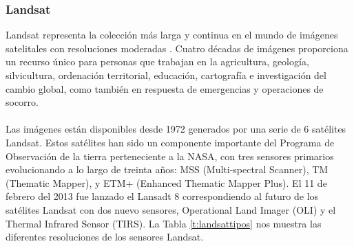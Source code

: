 \subsubsection{Landsat}\label{sec:landsat}
Landsat representa la colecci\'on m\'as larga y continua en el mundo de im\'agenes satelitales con resoluciones moderadas \cite{landsatNasa}. Cuatro d\'ecadas de im\'agenes proporciona un recurso \'unico para personas que trabajan en la agricultura, geolog\'ia, silvicultura, ordenaci\'on territorial, educaci\'on, cartograf\'ia e investigaci\'on del cambio global, como tambi\'en en respuesta de emergencias y operaciones de socorro.\\~\\
Las im\'agenes est\'an disponibles desde 1972 generados por una serie de 6 sat\'elites Landsat. Estos sat\'elites han sido un componente importante del Programa de Observaci\'on de la tierra perteneciente a la NASA, con tres sensores primarios evolucionando a lo largo de treinta años: MSS (Multi-spectral Scanner), TM (Thematic Mapper), y ETM+ (Enhanced Thematic Mapper Plus). 
El 11 de febrero del 2013 fue lanzado el Lansadt 8 correspondiendo al futuro de los sat\'elites Landsat con dos nuevo sensores, Operational Land Imager (OLI) y el Thermal Infrared Sensor (TIRS). La Tabla \ref{t:landsattipos} nos muestra las diferentes resoluciones de los sensores Landsat.

